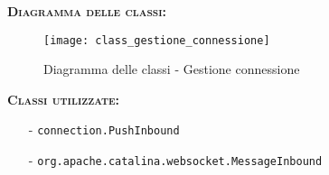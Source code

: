 \begin{description}
	\item{\scshape\bfseries Diagramma delle classi:}
\begin{figure}[H]
  \centering
  \texttt{[image: class\_gestione\_connessione]}
  \caption{Diagramma delle classi - Gestione connessione}\label{fig:gestioneconnessione}
\end{figure}
	
	\item{\scshape\bfseries Classi utilizzate:}
	\begin{itemize}[nolistsep, noitemsep]
	  \item[-] \texttt{connection.PushInbound}
	  \item[-] \texttt{org.apache.catalina.websocket.MessageInbound}
	\end{itemize}
\end{description}


